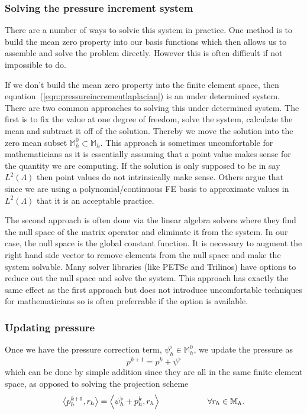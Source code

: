 \documentclass[letterpaper]{erdc}
\begin{document}
\subsubsection{Solving the pressure increment system}\label{sec:NeumannLaplaceEquationSolvers}
There are a number of ways to solvie this system in practice.  One method is to build the mean zero property into our basis functions which then allows us to assemble and solve the problem directly.  However this is often difficult if not impossible to do.  

If we don't build the mean zero property into the finite element space, then equation~(\ref{eqn:pressureincrementlaplacian}) is an under determined system.  There are two common approaches to solving this under determined system.  The first is to fix the value at one degree of freedom, solve the system, calculate the mean and subtract it off of the solution.  Thereby we move the solution into the zero mean subset $\mathbb{M}_h^0\subset \mathbb{M}_h$.  This approach is sometimes uncomfortable for mathematicians as it is essentially assuming that a point value makes sense for the quantity we are computing.  If the solution is only supposed to be in say $L^2(\Lambda)$ then point values do not intrinsically make sense.  Others argue that since we are using a polynomial/continuous FE basis to approximate values in $L^2(\Lambda)$ that it is an acceptable practice.  

The second approach is often done via the linear algebra solvers where they find the null space of the matrix operator and eliminate it from the system.  In our case, the null space is the global constant function.  It is necessary to augment the right hand side vector to remove elements from the null space and make the system solvable.  Many solver libraries (like PETSc and Trilinos) have options to reduce out the null space and solve the system.  This approach has exactly the same effect as the first approach but does not introduce uncomfortable techniques for mathematicians so is often preferrable if the option is available.


\subsubsection{Updating pressure}
Once we have the pressure correction term, $\psi^{\flat}_h\in \mathbb{M}_h^0$, we update the pressure as
\begin{equation}\label{eqn:rotationalpressureupdate}
  p^{k+1} = p^{k} + \psi^{\flat}
\end{equation}
which can be done by simple addition since they are all in the same finite element space, as opposed to solving the projection scheme 
\begin{equation}
  \left\langle p_h^{k+1}, r_h \right\rangle = \left\langle \psi_h^{\flat} + p_h^{k}, r_h \right\rangle \hspace{2cm} \forall r_h\in \mathbb{M}_h.
\end{equation}
\end{document}

